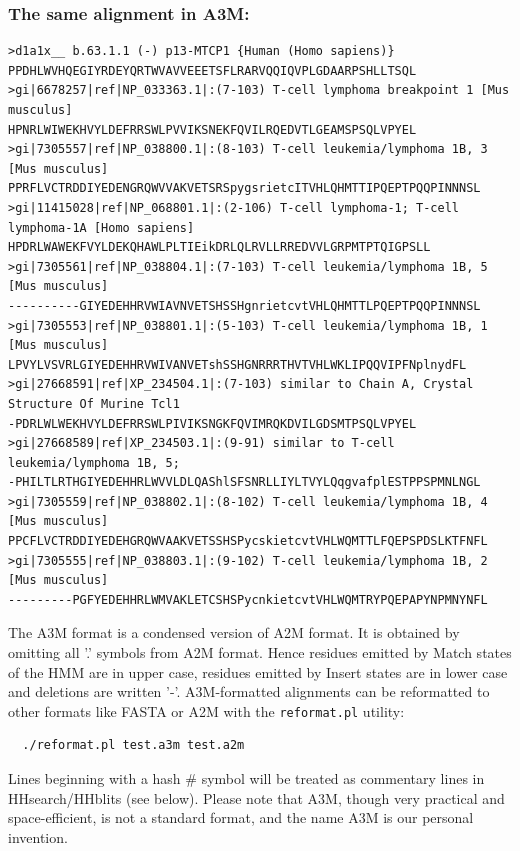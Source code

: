 \documentclass[11pt,a4paper]{article}
\begin{document}
\subsubsection*{The same alignment in A3M:}

\scriptsize\begin{verbatim}
>d1a1x__ b.63.1.1 (-) p13-MTCP1 {Human (Homo sapiens)}
PPDHLWVHQEGIYRDEYQRTWVAVVEEETSFLRARVQQIQVPLGDAARPSHLLTSQL
>gi|6678257|ref|NP_033363.1|:(7-103) T-cell lymphoma breakpoint 1 [Mus musculus]
HPNRLWIWEKHVYLDEFRRSWLPVVIKSNEKFQVILRQEDVTLGEAMSPSQLVPYEL
>gi|7305557|ref|NP_038800.1|:(8-103) T-cell leukemia/lymphoma 1B, 3 [Mus musculus]
PPRFLVCTRDDIYEDENGRQWVVAKVETSRSpygsrietcITVHLQHMTTIPQEPTPQQPINNNSL
>gi|11415028|ref|NP_068801.1|:(2-106) T-cell lymphoma-1; T-cell lymphoma-1A [Homo sapiens]
HPDRLWAWEKFVYLDEKQHAWLPLTIEikDRLQLRVLLRREDVVLGRPMTPTQIGPSLL
>gi|7305561|ref|NP_038804.1|:(7-103) T-cell leukemia/lymphoma 1B, 5 [Mus musculus]
----------GIYEDEHHRVWIAVNVETSHSSHgnrietcvtVHLQHMTTLPQEPTPQQPINNNSL
>gi|7305553|ref|NP_038801.1|:(5-103) T-cell leukemia/lymphoma 1B, 1 [Mus musculus]
LPVYLVSVRLGIYEDEHHRVWIVANVETshSSHGNRRRTHVTVHLWKLIPQQVIPFNplnydFL
>gi|27668591|ref|XP_234504.1|:(7-103) similar to Chain A, Crystal Structure Of Murine Tcl1
-PDRLWLWEKHVYLDEFRRSWLPIVIKSNGKFQVIMRQKDVILGDSMTPSQLVPYEL
>gi|27668589|ref|XP_234503.1|:(9-91) similar to T-cell leukemia/lymphoma 1B, 5;
-PHILTLRTHGIYEDEHHRLWVVLDLQAShlSFSNRLLIYLTVYLQqgvafplESTPPSPMNLNGL
>gi|7305559|ref|NP_038802.1|:(8-102) T-cell leukemia/lymphoma 1B, 4 [Mus musculus] 
PPCFLVCTRDDIYEDEHGRQWVAAKVETSSHSPycskietcvtVHLWQMTTLFQEPSPDSLKTFNFL
>gi|7305555|ref|NP_038803.1|:(9-102) T-cell leukemia/lymphoma 1B, 2 [Mus musculus]
---------PGFYEDEHHRLWMVAKLETCSHSPycnkietcvtVHLWQMTRYPQEPAPYNPMNYNFL
\end{verbatim}\normalsize

The A3M format is a condensed version of A2M format. It is obtained by omitting all '.' 
symbols from A2M format. Hence residues emitted by Match states of the HMM are in upper 
case, residues emitted by Insert states are in lower case and deletions are written '-'.
A3M-formatted alignments can be reformatted to other formats like FASTA or A2M with 
the \verb`reformat.pl` utility:
\begin{verbatim}
  ./reformat.pl test.a3m test.a2m
\end{verbatim}
Lines beginning with a hash \# symbol will be treated as commentary lines in HHsearch/HHblits
(see below). Please note that A3M, though very practical and space-efficient, 
is not a standard format, and the name A3M is our personal invention.
\end{document}
